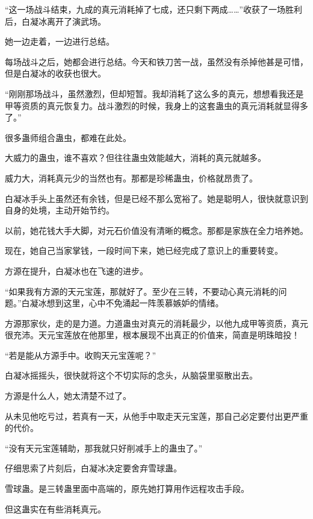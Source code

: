 
\begin{this_body}



“这一场战斗结束，九成的真元消耗掉了七成，还只剩下两成……”收获了一场胜利后，白凝冰离开了演武场。

她一边走着，一边进行总结。

每场战斗之后，她都会进行总结。今天和铁刀苦一战，虽然没有杀掉他甚是可惜，但是白凝冰的收获也很大。

“刚刚那场战斗，虽然激烈，但却短暂。我却消耗了这么多的真元，想想看我还是甲等资质的真元恢复力。战斗激烈的时候，我身上的这套蛊虫的真元消耗就显得多了。”

很多蛊师组合蛊虫，都难在此处。

大威力的蛊虫，谁不喜欢？但往往蛊虫效能越大，消耗的真元就越多。

威力大，消耗真元少的当然也有。那都是珍稀蛊虫，价格就昂贵了。

白凝冰手头上虽然还有余钱，但是已经不那么宽裕了。她是聪明人，很快就意识到自身的处境，主动开始节约。

以前，她花钱大手大脚，对元石价值没有清晰的概念。那都是家族在全力培养她。

现在，她自己当家掌钱，一段时间下来，她已经完成了意识上的重要转变。

方源在提升，白凝冰也在飞速的进步。

“如果我有方源的天元宝莲，那就好了。至少在三转，不要动心真元消耗的问题。”白凝冰想到这里，心中不免涌起一阵羡慕嫉妒的情绪。

方源那家伙，走的是力道。力道蛊虫对真元的消耗最少，以他九成甲等资质，真元很充沛。天元宝莲放在他那里，根本展现不出真正的价值来，简直是明珠暗投！

“若是能从方源手中。收购天元宝莲呢？”

白凝冰摇摇头，很快就将这个不切实际的念头，从脑袋里驱散出去。

方源是什么人，她太清楚不过了。

从未见他吃亏过，若真有一天，从他手中取走天元宝莲，那自己必定要付出更严重的代价。

“没有天元宝莲辅助，那我就只好削减手上的蛊虫了。”

仔细思索了片刻后，白凝冰决定要舍弃雪球蛊。

雪球蛊。是三转蛊里面中高端的，原先她打算用作远程攻击手段。

但这蛊实在有些消耗真元。


\end{this_body}
